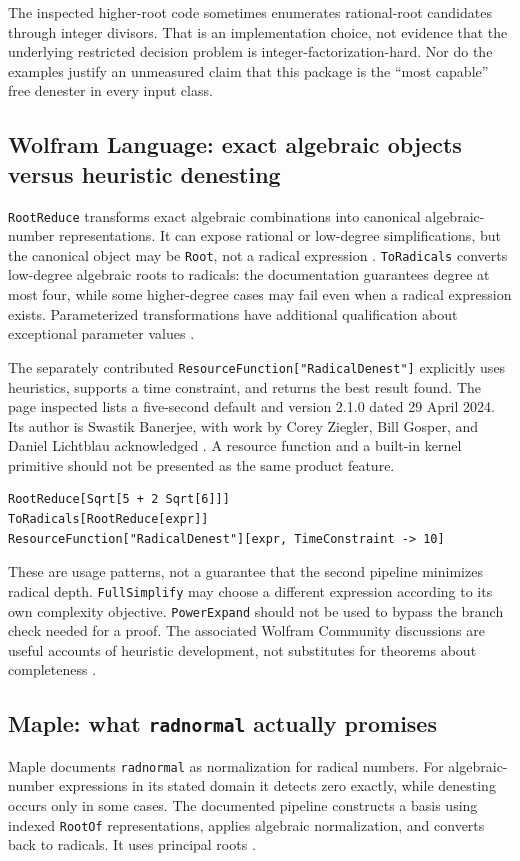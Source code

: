 \documentclass[11pt,a4paper]{article}
\numberwithin{equation}{section}
\theoremstyle{definition}\newtheorem{definition}[theorem]{Definition}
\theoremstyle{remark}\newtheorem{remark}[theorem]{Remark}
\begin{document}
The inspected higher-root code sometimes enumerates rational-root candidates through integer divisors. That is an implementation choice, not evidence that the underlying restricted decision problem is integer-factorization-hard. Nor do the examples justify an unmeasured claim that this package is the ``most capable'' free denester in every input class.

\subsection{Wolfram Language: exact algebraic objects versus heuristic denesting}
\texttt{RootReduce} transforms exact algebraic combinations into canonical algebraic-number representations. It can expose rational or low-degree simplifications, but the canonical object may be \texttt{Root}, not a radical expression \cite{wolframroot}. \texttt{ToRadicals} converts low-degree algebraic roots to radicals: the documentation guarantees degree at most four, while some higher-degree cases may fail even when a radical expression exists. Parameterized transformations have additional qualification about exceptional parameter values \cite{wolframradical}.

The separately contributed \texttt{ResourceFunction["RadicalDenest"]} explicitly uses heuristics, supports a time constraint, and returns the best result found. The page inspected lists a five-second default and version 2.1.0 dated 29 April 2024. Its author is Swastik Banerjee, with work by Corey Ziegler, Bill Gosper, and Daniel Lichtblau acknowledged \cite{wolframrd}. A resource function and a built-in kernel primitive should not be presented as the same product feature.

\begin{lstlisting}
RootReduce[Sqrt[5 + 2 Sqrt[6]]]
ToRadicals[RootReduce[expr]]
ResourceFunction["RadicalDenest"][expr, TimeConstraint -> 10]
\end{lstlisting}
These are usage patterns, not a guarantee that the second pipeline minimizes radical depth. \texttt{FullSimplify} may choose a different expression according to its own complexity objective. \texttt{PowerExpand} should not be used to bypass the branch check needed for a proof. The associated Wolfram Community discussions are useful accounts of heuristic development, not substitutes for theorems about completeness \cite{wolframcommunity}.

\subsection{Maple: what \texttt{radnormal} actually promises}
Maple documents \texttt{radnormal} as normalization for radical numbers. For algebraic-number expressions in its stated domain it detects zero exactly, while denesting occurs only in some cases. The documented pipeline constructs a basis using indexed \texttt{RootOf} representations, applies algebraic normalization, and converts back to radicals. It uses principal roots \cite{maplerad}.
\end{document}
